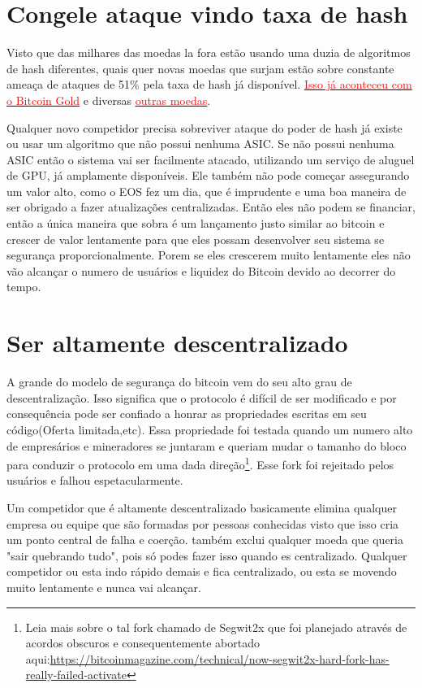 \section*{Congele ataque vindo taxa de hash}

Visto que das milhares das moedas la fora estão usando uma duzia de algoritmos de hash diferentes, quais quer novas moedas que surjam estão sobre constante ameaça de ataques de 51\% pela taxa de hash já disponível. \href{https://fortune.com/2018/05/29/bitcoin-gold-hack/}{\textcolor{red}{Isso já aconteceu com o Bitcoin Gold}} e diversas \href{https://www.coindesk.com/markets/2018/06/08/blockchains-once-feared-51-attack-is-now-becoming-regular/}{\textcolor{red}{outras moedas}}.

Qualquer novo competidor precisa sobreviver ataque do poder de hash já existe ou usar um algoritmo que não possui nenhuma ASIC. Se não possui nenhuma ASIC então o sistema vai ser facilmente atacado, utilizando um serviço de aluguel de GPU, já amplamente disponíveis. 
Ele também não pode começar assegurando um valor alto, como o EOS fez um dia, que é imprudente e uma boa maneira de ser obrigado a fazer atualizações centralizadas. 
Então eles não podem se financiar, então a única maneira que sobra é um lançamento justo similar ao bitcoin e crescer de valor lentamente para que eles possam desenvolver seu sistema se segurança proporcionalmente. Porem se eles crescerem muito lentamente eles não vão alcançar o numero de usuários e liquidez do Bitcoin devido ao decorrer do tempo.

\section*{Ser altamente descentralizado}

A grande do modelo de segurança do bitcoin vem do seu alto grau de descentralização.
Isso significa que o protocolo é difícil de ser modificado e por consequência pode ser confiado a honrar as propriedades escritas em seu código(Oferta limitada,etc). Essa propriedade foi testada quando um numero alto de empresários e mineradores se juntaram e queriam mudar o tamanho do bloco para conduzir o protocolo em uma dada direção\footnote{Leia mais sobre o tal fork chamado de Segwit2x que foi planejado através de acordos obscuros e consequentemente abortado aqui:\url{https://bitcoinmagazine.com/technical/now-segwit2x-hard-fork-has-really-failed-activate}}. Esse fork foi rejeitado pelos usuários e falhou espetacularmente.

Um competidor que é altamente descentralizado basicamente elimina qualquer empresa ou equipe que são formadas por pessoas conhecidas visto que isso cria um ponto central de falha e coerção. também exclui qualquer moeda que queria "sair quebrando tudo", pois só podes fazer isso quando es centralizado.
Qualquer competidor ou esta indo rápido demais e fica centralizado, ou esta se movendo muito lentamente e nunca vai alcançar.


